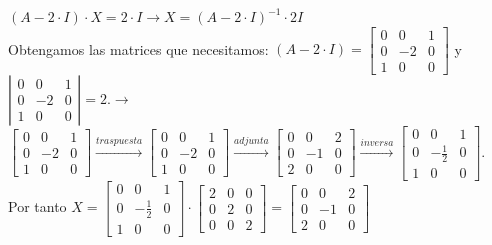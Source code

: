 \documentclass[addpoints,spanish, 12pt,a4paper]{exam}
\begin{document}
\begin{questions}
\begin{parts}
\begin{solution}
$(A-2\cdot I )\cdot X = 2\cdot I \to X=(A-2\cdot I)^{-1}\cdot 2I$\\Obtengamos las matrices que necesitamos: $(A-2\cdot I )=\left[\begin{matrix}0 & 0 & 1\\0 & -2 & 0\\1 & 0 & 0\end{matrix}\right]$ y $\left|\begin{matrix}0 & 0 & 1\\0 & -2 & 0\\1 & 0 & 0\end{matrix}\right|=2$.$\rightarrow$ $\left[\begin{matrix}0 & 0 & 1\\0 & -2 & 0\\1 & 0 & 0\end{matrix}\right]\xrightarrow{traspuesta}\left[\begin{matrix}0 & 0 & 1\\0 & -2 & 0\\1 & 0 & 0\end{matrix}\right]\xrightarrow{adjunta}\left[\begin{matrix}0 & 0 & 2\\0 & -1 & 0\\2 & 0 & 0\end{matrix}\right]\xrightarrow{inversa}\left[\begin{matrix}0 & 0 & 1\\0 & - \frac{1}{2} & 0\\1 & 0 & 0\end{matrix}\right]$.\\Por tanto $X=\left[\begin{matrix}0 & 0 & 1\\0 & - \frac{1}{2} & 0\\1 & 0 & 0\end{matrix}\right]\cdot\left[\begin{matrix}2 & 0 & 0\\0 & 2 & 0\\0 & 0 & 2\end{matrix}\right]=\left[\begin{matrix}0 & 0 & 2\\0 & -1 & 0\\2 & 0 & 0\end{matrix}\right]$
\end{solution}
\end{parts}

\addpoints



\end{questions}
\end{document}
